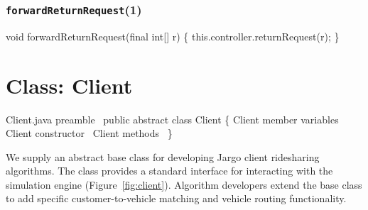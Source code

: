 \subsection{\texttt{forwardReturnRequest}(1)}
\nwenddocs{}\endmoddef{}
void forwardReturnRequest(final int[] r) \{
  this.controller.returnRequest(r);
\}
\eatline
{}\nwendcode{}\nwdocspar



\nwenddocs{}\chapter{Class: Client}
\label{client}

\nwenddocs{}\endmoddef{}
\LA{}Client.java preamble~{\nwtagstyle{}}\RA{}
public abstract class Client \{
  \LA{}\code{}Client\edoc{} member variables~{\nwtagstyle{}}\RA{}
  \LA{}\code{}Client\edoc{} constructor~{\nwtagstyle{}}\RA{}
  \LA{}\code{}Client\edoc{} methods~{\nwtagstyle{}}\RA{}
\}
\nwendcode{}\nwdocspar

We supply an abstract base class for developing Jargo client ridesharing
algorithms. The class provides a standard interface for interacting with the
simulation engine (Figure~\ref{fig:client}). Algorithm developers extend the
base class to add specific customer-to-vehicle matching and vehicle routing
functionality.

